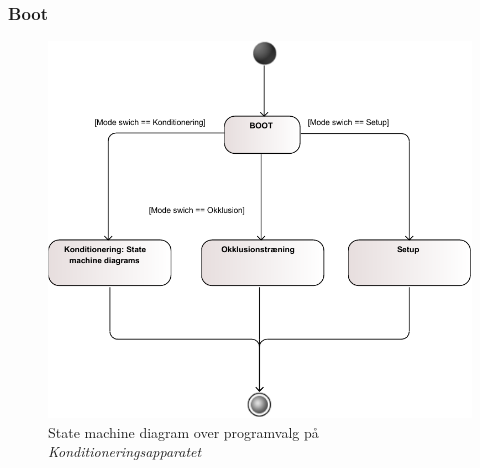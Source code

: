 \subsubsection{Boot}
\begin{figure}[H]
\includegraphics[width=\textwidth]{SystemArkitektur/pdfs/STM_BOOT-crop.pdf} 
\caption{State machine diagram over programvalg på \textit{Konditioneringsapparatet}}
\end{figure}

\newpage
